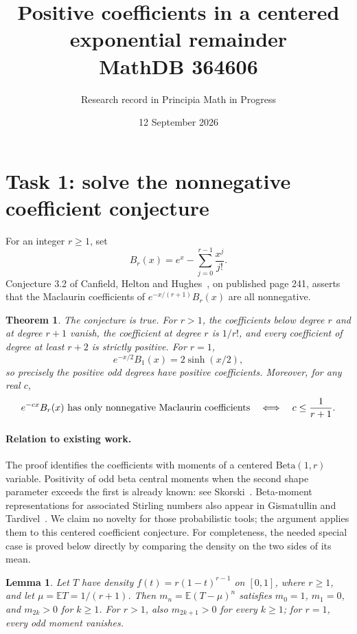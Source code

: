 \documentclass[11pt]{article}
\title{Positive coefficients in a centered exponential remainder\\
MathDB 364606}
\author{Research record in Principia Math in Progress}
\date{12 September 2026}
\newtheorem{theorem}{Theorem}
\newtheorem{lemma}{Lemma}
\newcommand{\E}{\mathbb E}
\begin{document}
\maketitle

\section*{Task 1: solve the nonnegative coefficient conjecture}
For an integer $r\geq1$, set
\[
 B_r(x)=e^x-\sum_{j=0}^{r-1}\frac{x^j}{j!}.
\]
Conjecture 3.2 of Canfield, Helton and Hughes~\cite{CHH}, on published
page 241, asserts that the Maclaurin coefficients of
$e^{-x/(r+1)}B_r(x)$ are all nonnegative.

\begin{theorem}\label{thm:main}
The conjecture is true. For $r>1$, the coefficients below degree $r$
and at degree $r+1$ vanish, the coefficient at degree $r$ is $1/r!$,
and every coefficient of degree at least $r+2$ is strictly positive.
For $r=1$,
\[
 e^{-x/2}B_1(x)=2\sinh(x/2),
\]
so precisely the positive odd degrees have positive coefficients.
Moreover, for any real $c$,
\[
 e^{-cx}B_r(x)\ \hbox{has only nonnegative Maclaurin coefficients}
 \quad\Longleftrightarrow\quad c\leq\frac1{r+1}.
\]
\end{theorem}

\paragraph{Relation to existing work.}
The proof identifies the coefficients with moments of a centered
$\mathrm{Beta}(1,r)$ variable. Positivity of odd beta central moments
when the second shape parameter exceeds the first is already known:
see Skorski~\cite[Theorem 3 and Corollary 3]{Skorski}.
Beta-moment representations for associated Stirling numbers also appear
in Gismatullin and Tardivel~\cite{GT}. We claim no novelty for those
probabilistic tools; the argument applies them to this centered
coefficient conjecture.
For completeness, the needed special case is proved below directly by
comparing the density on the two sides of its mean.

\begin{lemma}\label{lem:moments}
Let $T$ have density $f(t)=r(1-t)^{r-1}$ on $[0,1]$, where $r\geq1$,
and let $\mu=\E T=1/(r+1)$. Then
$m_n=\E(T-\mu)^n$ satisfies $m_0=1$, $m_1=0$, and
$m_{2k}>0$ for $k\geq1$.
For $r>1$, also $m_{2k+1}>0$ for every $k\geq1$;
for $r=1$, every odd moment vanishes.
\end{lemma}
\end{document}
